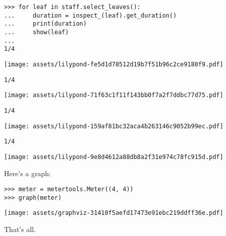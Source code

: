 \documentclass{article}
\begin{document}
\begin{comment}
<abjad>
for leaf in staff.select_leaves():
    duration = inspect_(leaf).get_duration()
    print(duration)
    show(leaf)

</abjad>
\end{comment}

\begin{singlespacing}
\begin{lstlisting}
>>> for leaf in staff.select_leaves():
...     duration = inspect_(leaf).get_duration()
...     print(duration)
...     show(leaf)
...
1/4
\end{lstlisting}
\noindent\texttt{[image: assets/lilypond-fe5d1d78512d19b7f51b96c2ce9180f9.pdf]}
\begin{lstlisting}
1/4
\end{lstlisting}
\noindent\texttt{[image: assets/lilypond-71f63c1f11f143bb0f7a2f7ddbc77d75.pdf]}
\begin{lstlisting}
1/4
\end{lstlisting}
\noindent\texttt{[image: assets/lilypond-159af81bc32aca4b263146c9052b99ec.pdf]}
\begin{lstlisting}
1/4
\end{lstlisting}
\noindent\texttt{[image: assets/lilypond-9e8d4612a88db8a2f31e974c78fc915d.pdf]}
\end{singlespacing}

Here's a graph:

\begin{comment}
<abjad>
meter = metertools.Meter((4, 4))
graph(meter)
</abjad>
\end{comment}

\begin{singlespacing}
\begin{lstlisting}
>>> meter = metertools.Meter((4, 4))
>>> graph(meter)
\end{lstlisting}
\noindent\texttt{[image: assets/graphviz-31410f5aefd17473e91ebc219ddff36e.pdf]}
\end{singlespacing}

That's all.
\end{document}
